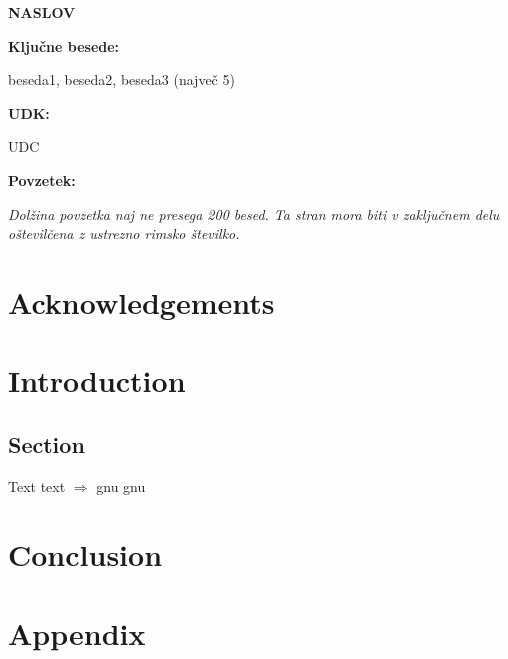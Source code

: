 \documentclass[a4paper, twoside, 12pt]{book}
\newcommand\NASLOV{NASLOV}
\newcommand\UDC{UDC}
\newenvironment{FULLPAGE}
{
  \parindent=0pt
  \hyphenpenalty=10000
  \null
}
{
}
\begin{document}
\newpage
\begin{FULLPAGE}
  \begin{Large}
    \textbf{\NASLOV}\par
  \end{Large}
  \vspace*{2.0cm}

  \textbf{Ključne besede:}

  beseda1, beseda2, beseda3 (največ 5)
  \vspace*{2.0cm}

  \textbf{UDK:}

  \UDC
  \vspace*{2.0cm}

  \textbf{Povzetek:}

  \textit{Dolžina povzetka naj ne presega 200 besed. Ta stran mora biti v zaključnem delu oštevilčena z ustrezno rimsko številko.}
\end{FULLPAGE}

\chapter*{Acknowledgements}

\tableofcontents

\listoffigures

\listoftables

\lstlistoflistings

\printglossary[type=\acronymtype]
\printglossary

\mainmatter

\chapter{Introduction}
\section{Section}
Text \cite{knuth_fa} text $\Rightarrow$ \gls{gnu} \gls{gnu}

\chapter{Conclusion}

\appendix

\chapter{Appendix}

\printbibliography[title={References}, notkeyword=own]

\nocite{own}
\printbibliography[title={Personal bibliography}, keyword=own]
\end{document}
